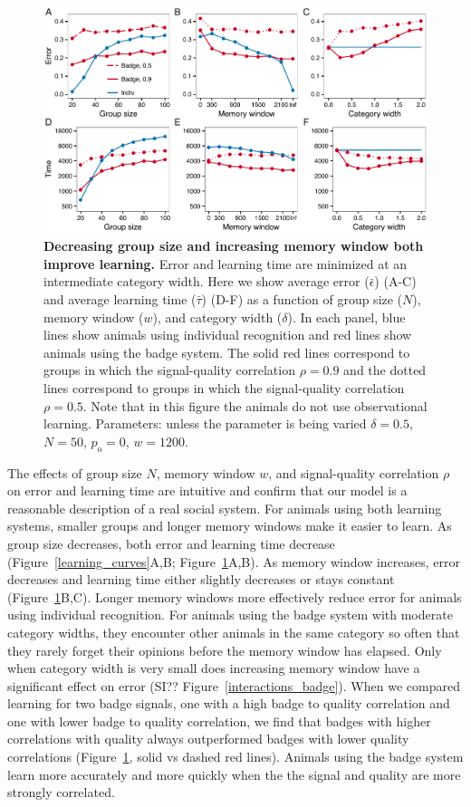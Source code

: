 \begin{figure}
\includegraphics[width=6.85in]{figures/parameters.pdf}
\caption{\sffamily\small\textbf{Decreasing group size and increasing memory window both improve learning.} Error and learning time are minimized at an intermediate category width. Here we show average error ($\bar{\epsilon}$) (A-C) and average learning time ($\bar{\tau}$) (D-F) as a function of group size ($N$), memory window ($w$), and category width ($\delta$). In each panel, blue lines show animals using individual recognition and red lines show animals using the badge system. The solid red lines correspond to groups in which the signal-quality correlation $\rho=0.9$ and the dotted lines correspond to groups in which the signal-quality correlation $\rho=0.5$. Note that in this figure the animals do not use observational learning. Parameters: unless the parameter is being varied $\delta = 0.5$, $N=50$, $p_\text{o}=0$, $w=1200$.}
\label{parameters}
\end{figure}


The effects of group size $N$, memory window $w$, and signal-quality correlation $\rho$ on error and learning time are intuitive and confirm that our model is a reasonable description of a real social system. For animals using both learning systems, smaller groups and longer memory windows make it easier to learn. As group size decreases, both error and learning time decrease (Figure~\ref{learning_curves}A,B; Figure~\ref{parameters}A,B). As memory window increases, error decreases and learning time either slightly decreases or stays constant (Figure~\ref{parameters}B,C). Longer memory windows more effectively reduce error for animals using individual recognition. For animals using the badge system with moderate category widths, they encounter other animals in the same category so often that they rarely forget their opinions before the memory window has elapsed. Only when category width is very small does increasing memory window have a significant effect on error (SI?? Figure~\ref{interactions_badge}). When we compared learning for two badge signals, one with a high badge to quality correlation and one with lower badge to quality correlation, we find that badges with higher correlations with quality always outperformed badges with lower quality correlations (Figure~\ref{parameters}, solid vs dashed red lines). Animals using the badge system learn more accurately and more quickly when the the signal and quality are more strongly correlated.

